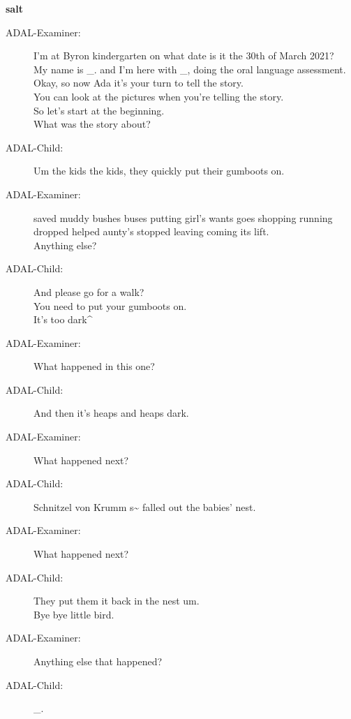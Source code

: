 \documentclass{article}
\newcommand{\turn}[2]{
\item[#1:] #2
}
\begin{document}
\begin{center}\textbf{salt}\end{center}

\begin{description}

\turn{ADAL-Examiner}{I'm at Byron kindergarten on what date is it the 30th of March 2021?\\
My name is \_. and I'm here with \_, doing the oral language assessment.\\
Okay, so now Ada it's your turn to tell the story.\\
You can look at the pictures when you're telling the story.\\
So let's start at the beginning.\\
What was the story about?}

\turn{ADAL-Child}{Um the kids the kids, they quickly put their gumboots on.}

\turn{ADAL-Examiner}{saved muddy bushes buses putting girl's wants goes shopping running dropped helped aunty's stopped leaving coming its lift.\\
Anything else?}

\turn{ADAL-Child}{And please go for a walk?\\
You need to put your gumboots on.\\
It's too dark\^{} }

\turn{ADAL-Examiner}{What happened in this one?}

\turn{ADAL-Child}{And then it's heaps and heaps dark.}

\turn{ADAL-Examiner}{What happened next?}

\turn{ADAL-Child}{Schnitzel von Krumm s\~{}  falled out the babies' nest.}

\turn{ADAL-Examiner}{What happened next?}

\turn{ADAL-Child}{They put them it back in the nest um.\\
Bye bye little bird.}

\turn{ADAL-Examiner}{Anything else that happened?}

\turn{ADAL-Child}{\_.}


\end{description}
\end{document}

